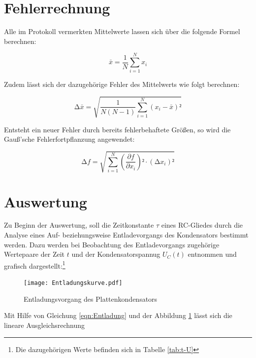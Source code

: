 %

%

\section{Fehlerrechnung}
\label{sec:Fehlerrechnung}

Alle im Protokoll vermerkten Mittelwerte lassen sich über die folgende Formel berechnen:

\begin{equation}
\label{eqn:Mittelwert}
    \bar{x} = \frac{1}{N}\sum_{i=1}^N x_i
\end{equation}

\noindent Zudem lässt sich der dazugehörige Fehler des Mittelwerts wie folgt berechnen:

\begin{equation}
\label{eqn:Mittelwertfehler}
    \increment \bar{x} = \sqrt{\frac{1}{N\left(N-1\right)}\sum_{i=1}^N \left(x_i - \bar{x}\right)²}
\end{equation}

\noindent Entsteht ein neuer Fehler durch bereits fehlerbehaftete Größen, so wird die Gauß'sche Fehlerfortpflanzung angewendet:

\begin{equation}
\label{eqn:Fehlerfortpflanzung}
    \increment f = \sqrt{\sum_{i=1}^N \left(\frac{\partial f}{\partial x_i}\right)²\cdot\left(\increment x_i\right)²}
\end{equation}


\section{Auswertung}
\label{sec:Auswertung}

Zu Beginn der Auswertung, soll die Zeitkonstante $\tau$ eines RC-Gliedes durch die Analyse eines Auf- beziehungsweise Entladevorgangs
des Kondensators bestimmt werden. Dazu werden bei Beobachtung des Entladevorgangs zugehörige Wertepaare der Zeit $t$ und der Kondensatorspannug $U_C(t)$
entnommen und grafisch dargestellt:\footnote{Die dazugehörigen Werte befinden sich in Tabelle \ref{tab:t-U}}

\begin{figure}[H]
    \centering
    \texttt{[image: Entladungskurve.pdf]}
    \caption{Entladungsvorgang des Plattenkondensators}
    \label{fig:Entladungskurve}
\end{figure}

\noindent Mit Hilfe von Gleichung \eqref{eqn:Entladung} und der Abbildung \ref{fig:Entladungskurve} lässt sich die lineare Ausgleichsrechnung 

